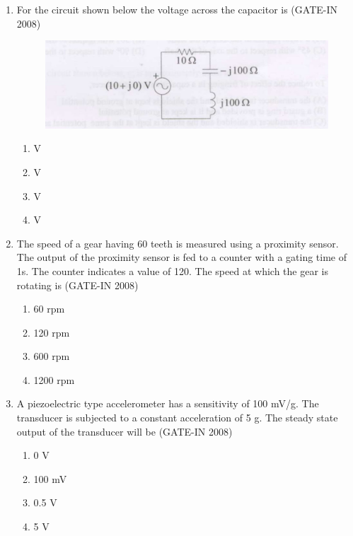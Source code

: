 \documentclass[journal,12pt,onecolumn]{IEEEtran}
\theoremstyle{remark}
\begin{document}
\begin{enumerate}
    \item For the circuit shown below  the voltage across the capacitor is \hfill{(GATE-IN 2008)}

\begin{figure}[H]
    \centering
    \includegraphics[width=0.5\columnwidth]{figs/i16.jpg}
    \caption{}
    \label{fig:placeholder16}
\end{figure}
\begin{multicols}{4}
    \begin{enumerate} 
        \item {} V
        \item {} V 
        \item {} V 
        \item {} V
    \end{enumerate}
    \end{multicols}
    
    \item The speed of a gear having 60 teeth is measured using a proximity sensor. The output of the
proximity sensor is fed to a counter with a gating time of 1s. The counter indicates a value of 120.
The speed at which the gear is rotating is \hfill{(GATE-IN 2008)}
\begin{multicols}{4}
    \begin{enumerate} 
        \item 60 rpm 
        \item 120 rpm
        \item 600 rpm
        \item 1200 rpm 
    \end{enumerate}
    \end{multicols}
    
    \item A piezoelectric type accelerometer has a sensitivity of 100 mV/g. The transducer is subjected to a
constant acceleration of 5 g. The steady state output of the transducer will be \hfill{(GATE-IN 2008)}
\begin{multicols}{4}
    \begin{enumerate} 
        \item 0 V 
        \item 100 mV
        \item 0.5 V
        \item 5 V
    \end{enumerate}
    \end{multicols}
    

\end{enumerate}
\end{document}

